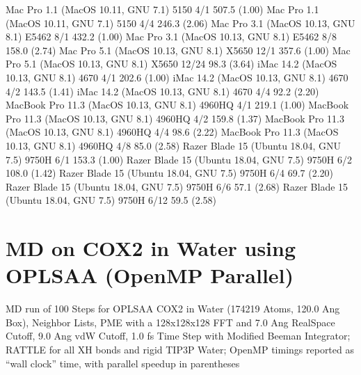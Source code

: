 \documentclass[letterpaper,11pt,english]{sphinxmanual}
\begin{document}
\begin{sphinxVerbatim}[commandchars=\\\{\}]
Mac Pro 1.1 (MacOS 10.11, GNU 7.1)             5150           4/1       507.5 (1.00)
Mac Pro 1.1 (MacOS 10.11, GNU 7.1)             5150           4/4       246.3 (2.06)
Mac Pro 3.1 (MacOS 10.13, GNU 8.1)            E5462           8/1       432.2 (1.00)
Mac Pro 3.1 (MacOS 10.13, GNU 8.1)            E5462           8/8       158.0 (2.74)
Mac Pro 5.1 (MacOS 10.13, GNU 8.1)            X5650          12/1       357.6 (1.00)
Mac Pro 5.1 (MacOS 10.13, GNU 8.1)            X5650         12/24        98.3 (3.64)
iMac 14.2 (MacOS 10.13, GNU 8.1)               4670           4/1       202.6 (1.00)
iMac 14.2 (MacOS 10.13, GNU 8.1)               4670           4/2       143.5 (1.41)
iMac 14.2 (MacOS 10.13, GNU 8.1)               4670           4/4        92.2 (2.20)
MacBook Pro 11.3 (MacOS 10.13, GNU 8.1)      4960HQ           4/1       219.1 (1.00)
MacBook Pro 11.3 (MacOS 10.13, GNU 8.1)      4960HQ           4/2       159.8 (1.37)
MacBook Pro 11.3 (MacOS 10.13, GNU 8.1)      4960HQ           4/4        98.6 (2.22)
MacBook Pro 11.3 (MacOS 10.13, GNU 8.1)      4960HQ           4/8        85.0 (2.58)
Razer Blade 15 (Ubuntu 18.04, GNU 7.5)        9750H           6/1       153.3 (1.00)
Razer Blade 15 (Ubuntu 18.04, GNU 7.5)        9750H           6/2       108.0 (1.42)
Razer Blade 15 (Ubuntu 18.04, GNU 7.5)        9750H           6/4        69.7 (2.20)
Razer Blade 15 (Ubuntu 18.04, GNU 7.5)        9750H           6/6        57.1 (2.68)
Razer Blade 15 (Ubuntu 18.04, GNU 7.5)        9750H          6/12        59.5 (2.58)
\end{sphinxVerbatim}


\section{MD on COX\sphinxhyphen{}2 in Water using OPLS\sphinxhyphen{}AA (OpenMP Parallel)}
\label{\detokenize{text/benchmarks:md-on-cox-2-in-water-using-opls-aa-openmp-parallel}}
MD run of 100 Steps for OPLS\sphinxhyphen{}AA COX\sphinxhyphen{}2 in Water (174219 Atoms, 120.0 Ang Box), Neighbor Lists, PME with a 128x128x128 FFT and 7.0 Ang Real\sphinxhyphen{}Space Cutoff, 9.0 Ang vdW Cutoff, 1.0 fs Time Step with Modified Beeman Integrator; RATTLE for all X\sphinxhyphen{}H bonds and rigid TIP3P Water; OpenMP timings reported as “wall clock” time, with parallel speedup in parentheses

\end{document}
